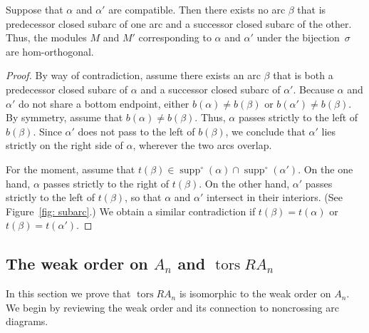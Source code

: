 \documentclass[ALCO,ThmDefs,Unicode,epreuves]{cedram}
\DeclareMathOperator{\tors}{tors}
\DeclareMathOperator{\supp}{supp}
\newcommand{\suppo}{\supp^{\circ}}
\renewcommand{\1}{\hat{1}}
\newcommand{\0}{\hat{0}}
\begin{document}
\begin{lemma}\label{lem: subarc implies crossing}
Suppose that $\alpha$ and $\alpha'$ are compatible.
Then there exists no arc $\beta$ that is predecessor closed subarc of
one arc and a successor closed subarc of the other.
Thus, the modules $M$ and $M'$ corresponding to $\alpha$ and $\alpha'$
under the bijection~$\sigma$ are hom-orthogonal. 
\end{lemma}

\begin{proof}
By way of contradiction, assume there exists an arc $\beta$ that is both a predecessor closed subarc of $\alpha$ and a successor closed subarc of $\alpha'$.
Because $\alpha$ and $\alpha'$ do not share a bottom endpoint, either $b(\alpha)\ne b(\beta)$ or $b(\alpha')\ne b(\beta)$.
By symmetry, assume that $b(\alpha)\ne b(\beta)$.
Thus, $\alpha$ passes strictly to the left of $b(\beta)$.
Since $\alpha'$ does not pass to the left of $b(\beta)$, we conclude that $\alpha'$ lies strictly on the right side of $\alpha$, wherever the two arcs overlap.


For the moment, assume that $t(\beta)\in \suppo(\alpha)\cap \suppo(\alpha')$.
On the one hand, $\alpha$ passes strictly to the right of $t(\beta)$.
On the other hand, $\alpha'$ passes strictly to the left of $t(\beta)$, so that $\alpha$ and $\alpha'$ intersect in their interiors.
(See Figure~\ref{fig: subarc}.)
We obtain a similar contradiction if $t(\beta)=t(\alpha)$ or $t(\beta)=t(\alpha')$.
\end{proof}


\subsection{The weak order on \texorpdfstring{$A_n$}{An} and \texorpdfstring{$\tors RA_n$}{tors RAn}}
\label{sec:shards}
In this section we prove that $\tors RA_n$ is isomorphic to the weak order on $A_n$.
We begin by reviewing the weak order and its connection to noncrossing arc diagrams.
\end{document}

